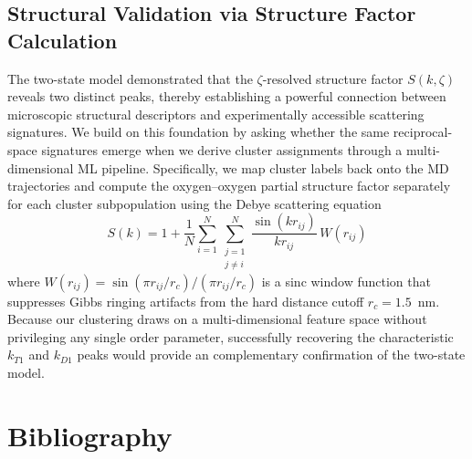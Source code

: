 \documentclass[aps, amsmath,amssymb, reprint, twocolumn, superscriptaddress]{revtex4-1}
\begin{document}
\subsection{Structural Validation via Structure Factor Calculation}
\label{sec:structure_factor}
The two-state model demonstrated that the $\zeta$-resolved structure factor $S(k,\zeta)$ reveals two distinct peaks, thereby establishing a powerful connection between microscopic structural descriptors and experimentally accessible scattering signatures. We build on this foundation by asking whether the same reciprocal-space signatures emerge when we derive cluster assignments through a multi-dimensional ML pipeline. Specifically, we map cluster labels back onto the MD trajectories and compute the oxygen--oxygen partial structure factor separately for each cluster subpopulation using the Debye scattering equation~\cite{debye_zerstreuung_1915}
\begin{equation}
S(k) = 1 + \frac{1}{N}\sum_{i=1}^{N}\sum_{\substack{j=1 \\ j\neq i}}^{N}\frac{\sin(k r_{ij})}{k r_{ij}}\,W(r_{ij})
\label{eq:debye}
\end{equation}
where $W(r_{ij}) = \sin(\pi r_{ij}/r_c)/(\pi r_{ij}/r_c)$ is a sinc window function that suppresses Gibbs ringing artifacts from the hard distance cutoff $r_c = 1.5$~nm. Because our clustering draws on a multi-dimensional feature space without privileging any single order parameter, successfully recovering the characteristic $k_{T1}$ and $k_{D1}$ peaks would provide an complementary confirmation of the two-state model.

\FloatBarrier


\section*{Bibliography}


\end{document}
